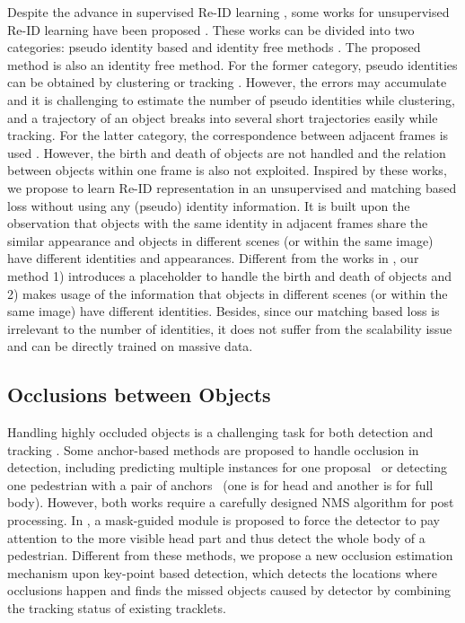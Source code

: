 \documentclass[final,1p,times,twocolumn]{elsarticle}
\begin{document}
	Despite the advance in supervised Re-ID learning \cite{fu2020improving,li2021triplet,sun2021visible,liu2021prgcn}, some works for unsupervised Re-ID learning have been proposed \cite{fu2021unsupervised,wang2020cycas, karthik2020simple, zhang2020fairmot, wu2020tracklet, fan2018unsupervised}.
		These works can be divided into two categories: pseudo identity based \cite{karthik2020simple, zhang2020fairmot, wu2020tracklet,fan2018unsupervised} and identity free methods \cite{wang2020cycas}. The proposed method is also an identity free method. For the former category, pseudo identities can be obtained by clustering \cite{wu2020tracklet, fan2018unsupervised} or tracking \cite{karthik2020simple}. However, the errors may accumulate and it is challenging to estimate the number of pseudo identities while clustering, and a trajectory of an object breaks into several short trajectories easily while tracking. For the latter category, the correspondence between adjacent frames is used \cite{wang2020cycas}. However, the birth and death of objects are not handled and the relation between objects within one frame is also not exploited.
	Inspired by these works, we propose to learn Re-ID representation in an unsupervised and matching based loss without using any (pseudo) identity information. It is built upon the observation that objects with the same identity in adjacent frames share the similar appearance and objects in different scenes (or within the same image) have different identities and appearances. Different from the works in \cite{wang2020cycas}, our method
	1) introduces a placeholder to handle the birth and death of objects and 2) makes usage of the information that objects in different scenes (or within the same image) have different identities.
	Besides, since our matching based loss is irrelevant to the number of identities, it does not suffer from the scalability issue and can be directly trained on massive data. 
	
	
	\subsection{Occlusions between Objects}
	Handling highly occluded objects is a challenging task for both detection \cite{chu2020detection, zhu2020crowded, chi2020pedhunter} and tracking \cite{chu2017online,zhu2018online,chu2019online, chu2020dasot,xu2019spatial,liugsm}. Some anchor-based methods are proposed to handle occlusion \cite{chu2020detection, zhu2020crowded, chi2020pedhunter} in detection, including
	predicting multiple instances for one proposal~\cite{chu2020detection} or detecting one pedestrian with a pair of anchors~\cite{zhu2020crowded} (one is for head and another is for full body). However, both works require a carefully designed NMS algorithm for post processing. In \cite{chi2020pedhunter}, a mask-guided module is proposed to force the detector to pay attention to the more visible head part and thus detect the whole body of a pedestrian. 
	Different from these methods, we propose a new occlusion estimation mechanism upon key-point based detection, which detects the locations where occlusions happen and finds the missed objects caused by detector by combining the tracking status of existing tracklets.
	
\end{document}
